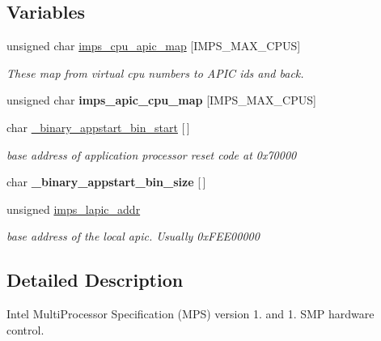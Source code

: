 \subsection*{Variables}
\begin{DoxyCompactItemize}
\item 
\mbox{\label{smp-imps_8h_a55228e5a2229d3f3df067c98b66e5214}} 
unsigned char \mbox{\hyperlink{smp-imps_8h_a55228e5a2229d3f3df067c98b66e5214}{imps\+\_\+cpu\+\_\+apic\+\_\+map}} \mbox{[}I\+M\+P\+S\+\_\+\+M\+A\+X\+\_\+\+C\+P\+US\mbox{]}
\begin{DoxyCompactList}\small\item\em These map from virtual cpu numbers to A\+P\+IC id\textquotesingle{}s and back. \end{DoxyCompactList}\item 
\mbox{\label{smp-imps_8h_a830d0d3de593954f2a646d19403afab3}} 
unsigned char {\bfseries imps\+\_\+apic\+\_\+cpu\+\_\+map} \mbox{[}I\+M\+P\+S\+\_\+\+M\+A\+X\+\_\+\+C\+P\+US\mbox{]}
\item 
\mbox{\label{smp-imps_8h_a8554077aa6e1ed0de60cb896d2fe23d0}} 
char \mbox{\hyperlink{smp-imps_8h_a8554077aa6e1ed0de60cb896d2fe23d0}{\+\_\+binary\+\_\+appstart\+\_\+bin\+\_\+start}} \mbox{[}$\,$\mbox{]}
\begin{DoxyCompactList}\small\item\em base address of application processor reset code at 0x70000 \end{DoxyCompactList}\item 
\mbox{\label{smp-imps_8h_ab20a3e384123a9936c61940395bde993}} 
char {\bfseries \+\_\+binary\+\_\+appstart\+\_\+bin\+\_\+size} \mbox{[}$\,$\mbox{]}
\item 
\mbox{\label{smp-imps_8h_ad8c4ff22d3eb7322acff621557229f55}} 
unsigned \mbox{\hyperlink{smp-imps_8h_ad8c4ff22d3eb7322acff621557229f55}{imps\+\_\+lapic\+\_\+addr}}
\begin{DoxyCompactList}\small\item\em base address of the local apic. Usually 0x\+F\+E\+E00000 \end{DoxyCompactList}\end{DoxyCompactItemize}


\subsection{Detailed Description}
Intel Multi\+Processor Specification (M\+PS) version 1. and 1. S\+MP hardware control. 

